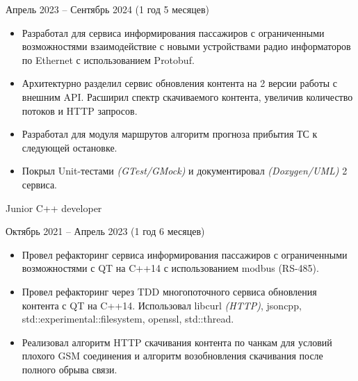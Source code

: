 {    \cvexperiencePeriod
        {Апрель 2023 -- Сентябрь 2024 (1 год 5 месяцев)}

    \smallskip
    \begin{itemize}

        \item
            Разработал для сервиса информирования пассажиров с ограниченными возможностями
            взаимодействие с новыми устройствами радио информаторов по Ethernet с использованием
            Protobuf.

        \item
            Архитектурно разделил сервис обновления контента на 2 версии работы с внешним API.
            Расширил спектр скачиваемого контента, увеличив количество потоков и HTTP запросов.

        \item
            Разработал для модуля маршрутов алгоритм прогноза прибытия ТС к следующей остановке.

        \item
            Покрыл Unit-тестами \textit{(GTest/GMock)} и документировал \textit{(Doxygen/UML)}
            2 сервиса.

    \end{itemize}


    \cvexperiencePosition
        {Junior C++ developer}

    \cvexperiencePeriod
        {Октябрь 2021 -- Апрель 2023 (1 год 6 месяцев)}

    \smallskip
    \begin{itemize}

        \item
            Провел рефакторинг сервиса информирования пассажиров с ограниченными возможностями
            с QT на C++14 с использованием modbus (RS-485).

        \item
            Провел рефакторинг через TDD многопоточного сервиса обновления контента с QT на C++14.
            Использовал libcurl \textit{(HTTP)}, jsoncpp, std::experimental::filesystem, openssl,
            std::thread.

        \item
            Реализовал алгоритм HTTP скачивания контента по чанкам для условий плохого GSM
            соединения и алгоритм возобновления скачивания после полного обрыва связи.


\end{itemize}}
